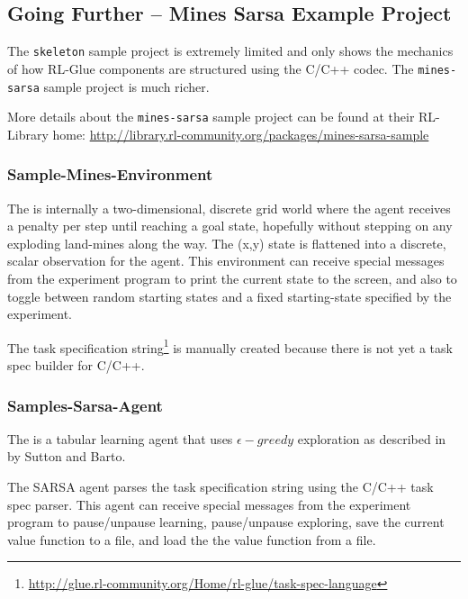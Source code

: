 \documentclass[11pt]{article}
\begin{document}
\subsection{Going Further -- Mines Sarsa Example Project}
\label{mines-sarsa-sample}
The \texttt{skeleton} sample project is extremely limited and only shows the mechanics of how RL-Glue components are structured using the C/C++ codec.  The \texttt{mines-sarsa} sample project is much richer.

More details about the \texttt{mines-sarsa} sample project can be found at their RL-Library home:\newline
\url{http://library.rl-community.org/packages/mines-sarsa-sample}

\subsubsection{Sample-Mines-Environment}
\label{mines-sample}
The 
is internally a two-dimensional, discrete grid world where the agent receives a penalty per step until reaching a goal state, hopefully without stepping on any exploding land-mines along the way.  The (x,y) state is flattened into a discrete, scalar observation for the agent.  This environment can receive special messages from the experiment program to print the current state to the screen, and also to toggle between random starting states and a fixed starting-state specified by the experiment.

The task specification string\footnote{\url{http://glue.rl-community.org/Home/rl-glue/task-spec-language}} is manually created because there is not yet a task spec builder for C/C++. 

\subsubsection{Samples-Sarsa-Agent}
\label{sarsa-sample}
The 
is a tabular learning agent that uses $\epsilon-greedy$ exploration as described in  by Sutton and Barto.

The SARSA agent parses the task specification string using the C/C++ task spec parser.  This agent can receive special messages from the experiment program to pause/unpause learning, pause/unpause exploring, save the current value function to a file, and load the the value function from a file.
\end{document}
